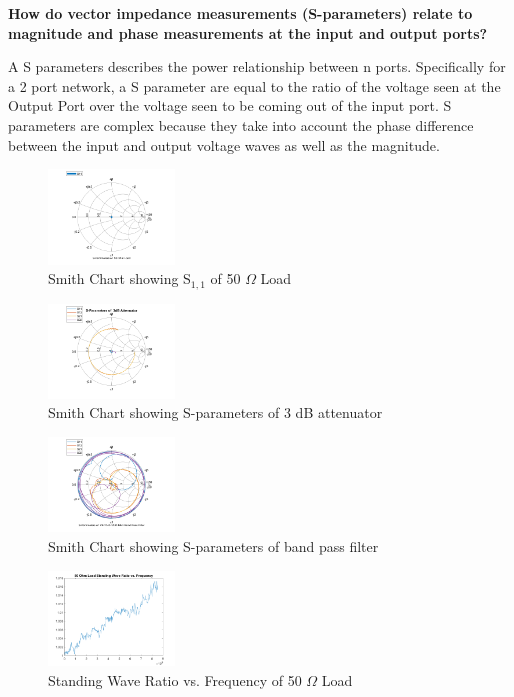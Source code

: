\documentclass[journal]{IEEEtran}
\begin{document}
\textbf{How do vector impedance measurements (S-parameters) relate to magnitude
    and phase measurements at the input and output ports?}

A S parameters describes the power relationship between n ports. Specifically
for a 2 port network, a S parameter are equal to the ratio of the voltage seen
at the Output Port over the voltage seen to be coming out of the input port. S
parameters are complex because they take into account the phase difference
between the input and output voltage waves as well as the magnitude.

\begin{figure}[hbp]
    \centering
    \includegraphics[width=0.3\textwidth]{load_smith_chart.png}
    \caption{\label{fig:load_smith} Smith Chart showing S\({}_{1,1}\) of 50 \(\Omega\) Load}
\end{figure}

\begin{figure}[hbp]
    \centering
    \includegraphics[width=0.3\textwidth]{3db_smith_chart.png}
    \caption{\label{fig:3db_smith} Smith Chart showing S-parameters of 3 dB attenuator}
\end{figure}

\begin{figure}[hbp]
    \centering
    \includegraphics[width=0.3\textwidth]{band_pass_smith_chart.png}
    \caption{\label{fig:band_pass_smith} Smith Chart showing S-parameters of band pass filter}
\end{figure}

\begin{figure}[hbp]
    \centering
    \includegraphics[width=0.3\textwidth]{load_swr.png}
    \caption{\label{fig:load_swr}  Standing Wave Ratio vs. Frequency  of 50 \(\Omega\) Load}
\end{figure}
\end{document}
